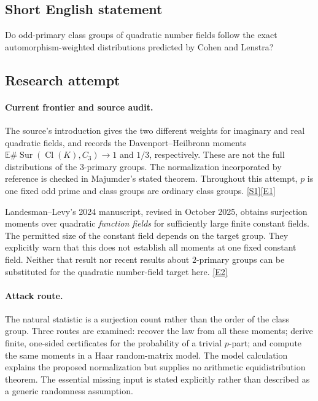 \documentclass[11pt,a4paper]{article}
\newcommand{\E}{\mathbb{E}}
\newcommand{\sref}[2]{\hyperlink{source:#1:#2}{[S#2]}}
\newcommand{\eref}[2]{\hyperlink{extra:#1:#2}{[E#2]}}
\numberwithin{equation}{section}
\begin{document}
\subsection{Short English statement}
Do odd-primary class groups of quadratic number fields follow the exact automorphism-weighted distributions predicted by Cohen and Lenstra?
\subsection{Research attempt}

\paragraph{Current frontier and source audit.}
The source's introduction gives the two different weights for imaginary
and real quadratic fields, and records the Davenport--Heilbronn moments
$\E\#\operatorname{Sur}(\operatorname{Cl}(K),C_3)\to1$ and $1/3$,
respectively. These are not the full distributions of the $3$-primary
groups. The normalization incorporated by reference is checked in
Majumder's stated theorem. Throughout this attempt, $p$ is one fixed odd
prime and class groups are ordinary class groups. \sref{30006735}{1}\eref{30006735}{1}

Landesman--Levy's 2024 manuscript, revised in October 2025, obtains
surjection moments over quadratic \emph{function fields} for sufficiently
large finite constant fields. The permitted size of the constant field
depends on the target group. They explicitly warn that this does not
establish all moments at one fixed constant field. Neither that result
nor recent results about $2$-primary groups can be substituted for the
quadratic number-field target here. \eref{30006735}{2}

\paragraph{Attack route.}
The natural statistic is a surjection count rather than the order of the
class group. Three routes are examined: recover the law from all these
moments; derive finite, one-sided certificates for the probability of a
trivial $p$-part; and compute the same moments in a Haar random-matrix
model. The model calculation explains the proposed normalization but
supplies no arithmetic equidistribution theorem. The essential missing
input is stated explicitly rather than described as a generic randomness
assumption.
\end{document}
